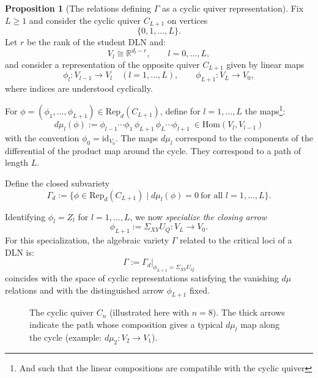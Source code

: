 \documentclass{article}
\newcommand{\R}{\mathbb{R}}
\theoremstyle{definition}
\newtheorem{proposition}[theorem]{Proposition}
\begin{document}
\begin{proposition}[The relations defining $\Gamma$ as a cyclic quiver representation]\label{rem:Gamma-cyclic-quiver}
Fix $L\ge 1$ and consider the cyclic quiver $C_{L+1}$ on vertices
\[
    \{0,1,\ldots,L\}.
\]
Let $r$ be the rank of the student DLN and:
\[
    V_l \cong \mathbb{R}^{d_l-r}, \qquad l=0,\ldots,L,
\]
and consider a representation of the opposite quiver $C_{L+1}$ given by linear maps
\[
    \phi_{l}: V_{l-1}\to V_{l} \quad (l=1,\ldots,L),
    \qquad
    \phi_{L+1}: V_{L}\to V_{0},
\]
where indices are understood cyclically.

For $\phi=(\phi_1,\ldots,\phi_{L+1})\in \mathrm{Rep}_d(C_{L+1})$, define for
$l=1,\ldots,L$ the maps\footnote{And such that the linear compositions are compatible with the cyclic quiver}:
\[
    d\mu_{l}(\phi)
    :=
    \phi_{l-1}\cdots\phi_{1}\,
    \phi_{L+1}\,
    \phi_{L}\cdots\phi_{l+1} \ \in\text{Hom}(V_l,V_{l-1})
\]
with the convention $\phi_0=\mathrm{id}_{V_0}$.
The maps $d\mu_l$ correspond to the components of the differential of the product map
around the cycle. They correspond to a path of length $L$.

Define the closed subvariety
\[
\Gamma_d
:=
\Big\{
\phi\in \mathrm{Rep}_d(C_{L+1})
\;\Big|\;
d\mu_l(\phi)=0
\ \text{for all } l=1,\ldots,L
\Big\}.
\]

Identifying $\phi_l=Z_l$ for $l=1,\ldots,L$, we now \emph{specialize the closing arrow}
\[
    \phi_{L+1} := \Sigma_{XY}U_Q : V_L \to V_0.
\]
For this specialization, the algebraic variety $\Gamma$ related to the critical loci of a DLN is:
\[
    \Gamma
    :=
    \Gamma_d\big|_{\phi_{L+1}=\Sigma_{XY}U_Q}
\]
coincides with the space of cyclic representations satisfying the vanishing
$d\mu$ relations and with the distinguished arrow $\phi_{L+1}$ fixed.
\end{proposition}

\begin{figure}[t]
    \centering
    \caption{The cyclic quiver $C_n$ (illustrated here with $n=8$). The thick arrows indicate the path whose composition gives a typical $d\mu_l$ map along the cycle (example: $d\mu_{2}:V_2\to V_1$).}
\end{figure}
\end{document}

